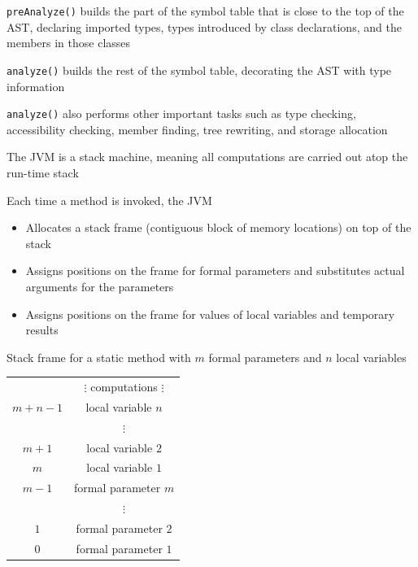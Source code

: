 \documentclass[8pt,a4paper,compress]{beamer}
\begin{document}
\begin{frame}[fragile]
\pause

\lstinline{preAnalyze()} builds the part of the symbol table that is close to the top of the AST, declaring imported types, types introduced by class declarations, and the members in those classes

\pause\bigskip

\lstinline{analyze()} builds the rest of the symbol table, decorating the AST with type information

\pause\bigskip

\lstinline{analyze()} also performs other important tasks such as type checking, accessibility checking, member finding, tree rewriting, and storage allocation
\end{frame}

\begin{frame}[fragile]
\pause

The JVM is a stack machine, meaning all computations are carried out atop the run-time stack

\pause\bigskip

Each time a method is invoked, the JVM
\begin{itemize}
\pause
\item Allocates a stack frame (contiguous block of memory locations) on top of the stack

\pause
\item Assigns positions on the frame for formal parameters and substitutes actual arguments for the parameters

\pause
\item Assigns positions on the frame for values of local variables and temporary results
\end{itemize}

\pause\bigskip

\begin{overprint}
Stack frame for a static method with $m$ formal parameters and $n$ local variables

\smallskip

\scriptsize{
\begin{center}
\begin{tabular}{c|c|} \cline{2-2}
& \makecell{$\vdots$ \\ computations \\ $\vdots$} \\ \cline{2-2}
$m+n-1$ & local variable $n$ \\ \cline{2-2}
& $\vdots$ \\ \cline{2-2}
$m+1$ & local variable $2$ \\ \cline{2-2}
$m$ & local variable $1$ \\ \cline{2-2}
$m-1$ & formal parameter $m$ \\ \cline{2-2}
& $\vdots$ \\ \cline{2-2}
$1$ & formal parameter $2$ \\ \cline{2-2}
$0$ & formal parameter $1$ \\ \cline{2-2}
\end{tabular}
\end{center}
}


\end{overprint}
\end{frame}
\end{document}
